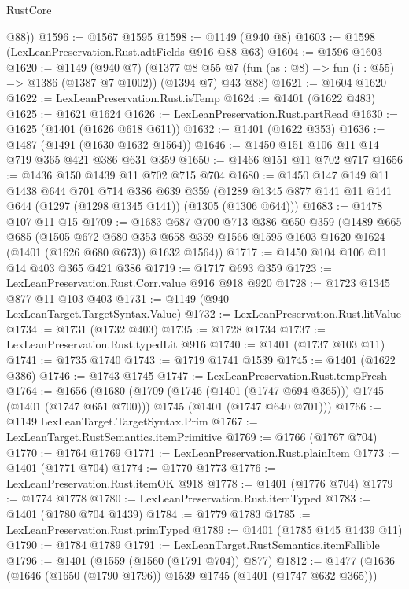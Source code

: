 \begin{lexlean}{RustCore}
\begin{coremodule}
        @88))
@1596 := @1567 @1595
@1598 := @1149 (@940 @8)
@1603 := @1598 (LexLeanPreservation.Rust.adtFields @916 @88 @63)
@1604 := @1596 @1603
@1620 := @1149
    (@940 @7)
    (@1377 @8 @55 @7 (fun (as : @8) => fun (i : @55) => @1386 (@1387 @7 @1002)) (@1394 @7) @43 @88)
@1621 := @1604 @1620
@1622 := LexLeanPreservation.Rust.isTemp
@1624 := @1401 (@1622 @483)
@1625 := @1621 @1624
@1626 := LexLeanPreservation.Rust.partRead
@1630 := @1625 (@1401 (@1626 @618 @611))
@1632 := @1401 (@1622 @353)
@1636 := @1487 (@1491 (@1630 @1632 @1564))
@1646 := @1450 @151 @106 @11 @14 @719 @365 @421 @386 @631 @359
@1650 := @1466 @151 @11 @702 @717
@1656 := @1436 @150 @1439 @11 @702 @715 @704
@1680 := @1450
    @147
    @149
    @11
    @1438
    @644
    @701
    @714
    @386
    @639
    @359
    (@1289 @1345 @877 @141 @11 @141 @644 (@1297 (@1298 @1345 @141)) (@1305 (@1306 @644)))
@1683 := @1478 @107 @11 @15
@1709 := @1683
    @687
    @700
    @713
    @386
    @650
    @359
    (@1489
      @665
      @685
      (@1505
        @672
        @680
        @353
        @658
        @359
        @1566
        @1595
        @1603
        @1620
        @1624
        (@1401 (@1626 @680 @673))
        @1632
        @1564))
@1717 := @1450 @104 @106 @11 @14 @403 @365 @421 @386
@1719 := @1717 @693 @359
@1723 := LexLeanPreservation.Rust.Corr.value @916 @918 @920
@1728 := @1723 @1345 @877 @11 @103 @403
@1731 := @1149 (@940 LexLeanTarget.TargetSyntax.Value)
@1732 := LexLeanPreservation.Rust.litValue
@1734 := @1731 (@1732 @403)
@1735 := @1728 @1734
@1737 := LexLeanPreservation.Rust.typedLit @916
@1740 := @1401 (@1737 @103 @11)
@1741 := @1735 @1740
@1743 := @1719 @1741 @1539
@1745 := @1401 (@1622 @386)
@1746 := @1743 @1745
@1747 := LexLeanPreservation.Rust.tempFresh
@1764 := @1656
    (@1680
      (@1709 (@1746 (@1401 (@1747 @694 @365))) @1745 (@1401 (@1747 @651 @700)))
      @1745
      (@1401 (@1747 @640 @701)))
@1766 := @1149 LexLeanTarget.TargetSyntax.Prim
@1767 := LexLeanTarget.RustSemantics.itemPrimitive
@1769 := @1766 (@1767 @704)
@1770 := @1764 @1769
@1771 := LexLeanPreservation.Rust.plainItem
@1773 := @1401 (@1771 @704)
@1774 := @1770 @1773
@1776 := LexLeanPreservation.Rust.itemOK @918
@1778 := @1401 (@1776 @704)
@1779 := @1774 @1778
@1780 := LexLeanPreservation.Rust.itemTyped
@1783 := @1401 (@1780 @704 @1439)
@1784 := @1779 @1783
@1785 := LexLeanPreservation.Rust.primTyped
@1789 := @1401 (@1785 @145 @1439 @11)
@1790 := @1784 @1789
@1791 := LexLeanTarget.RustSemantics.itemFallible
@1796 := @1401 (@1559 (@1560 (@1791 @704)) @877)
@1812 := @1477
    (@1636
      (@1646 (@1650 (@1790 @1796)) @1539 @1745 (@1401 (@1747 @632 @365)))

\end{coremodule}
\end{lexlean}
